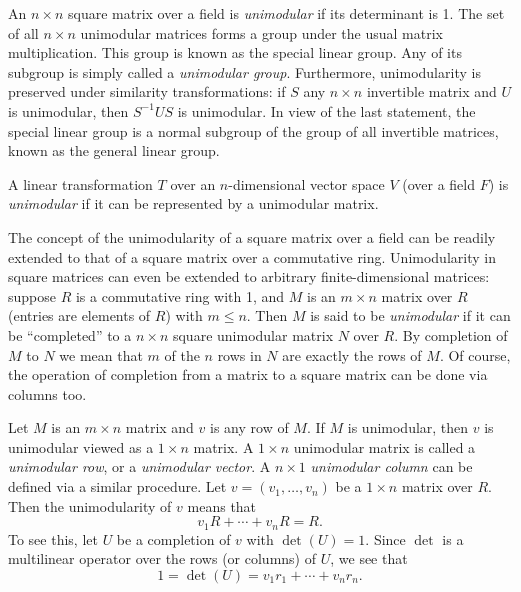 \documentclass[12pt]{article}
\begin{document}

An $n\times n$ square matrix over a field is \emph{unimodular} if its determinant is 1.  The set of all $n\times n$ unimodular matrices forms a group under the usual matrix multiplication.  This group is known as the special linear group.  Any of its subgroup is simply called a \emph{unimodular group}.  Furthermore, unimodularity is preserved under similarity transformations: if $S$ any $n\times n$ invertible matrix and $U$ is unimodular, then $S^{-1}US$ is unimodular.  In view of the last statement, the special linear group is a normal subgroup of the group of all invertible matrices, known as the general linear group.  

A linear transformation $T$ over an $n$-dimensional vector space $V$ (over a field $F$) is \emph{unimodular} if it can be represented by a unimodular matrix.

The concept of the unimodularity of a square matrix over a field can be readily extended to that of a square matrix over a commutative ring.  Unimodularity in square matrices can even be extended to arbitrary finite-dimensional matrices: suppose $R$ is a commutative ring with 1, and $M$ is an $m\times n$ matrix over $R$ (entries are elements of $R$) with $m\leq n$.  Then $M$ is said to be \emph{unimodular} if it can be ``completed'' to a $n\times n$ square unimodular matrix $N$ over $R$.  By completion of $M$ to $N$ we mean that $m$ of the $n$ rows in $N$ are exactly the rows of $M$.  Of course, the operation of completion from a matrix to a square matrix can be done via columns too.

Let $M$ is an $m\times n$ matrix and $v$ is any row of $M$.  If $M$ is unimodular, then $v$ is unimodular viewed as a $1\times n$ matrix.  A $1\times n$ unimodular matrix is called a \emph{unimodular row}, or a \emph{unimodular vector}.  A $n\times 1$ \emph{unimodular column} can be defined via a similar procedure.  Let $v=(v_1,\ldots,v_n)$ be a $1\times n$ matrix over $R$.  Then the unimodularity of $v$ means that $$v_1R+\cdots+v_nR=R.$$  To see this, let $U$ be a completion of $v$ with $\operatorname{det}(U)=1$.  Since $\operatorname{det}$ is a multilinear operator over the rows (or columns) of $U$, we see that $$1=\operatorname{det}(U)=v_1r_1+\cdots+v_nr_n.$$
\end{document}
